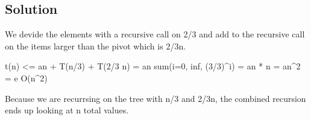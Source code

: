 \subsection*{Solution}

We devide the elements with a recursive call on 2/3 and add to the recursive call on the items larger than the pivot which is 2/3n.

t(n) <= an + T(n/3) + T(2/3 n)
     =  an sum(i=0, inf, (3/3)^i)
     =  an * n
     =  an^2
     =  e O(n^2)

Because we are recurrsing on the tree with n/3 and 2/3n, the combined recursion ends up looking at n total values.
